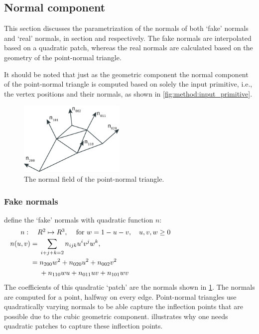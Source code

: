 
\subsection{Normal component}\label{ss:normal_component}
This section discusses the parametrization of the normals of both `fake' normals and `real' normals, in section  and  respectively. The fake normals are interpolated based on a quadratic patch, whereas the real normals are calculated based on the geometry of the point-normal triangle. 

It should be noted that just as the geometric component the normal component of the point-normal triangle is computed based on solely the input primitive, i.e., the vertex positions and their normals, as shown in \cref{fig:method:input_primitive}. 

\begin{figure}
	\centering
	\includegraphics[width=0.45\textwidth]{./content/img/method/normals.png}
	\caption{The normal field of the point-normal triangle.}
	\label{fig:method:normal_field}
\end{figure}

\subsubsection{Fake normals}
\label{sss:method:normals:fakeNormals}
	\citeauthor{vlachos2001curved} define the `fake' normals with quadratic function $n$:
	\begin{align}
	\noalign{$n: \quad R^2 \mapsto R^3,\quad$ for $w = 1 - u - v, \quad u, v, w \geq 0$}
	\begin{split}\label{eq:method:quadratic_normal_patch}
	    n(u,v) ={}& \sum_{i + j + k = 2} n_{ijk}u^i v^j w^k,\\
	      	   ={}& n_{200}w^2 + n_{020}u^2 + n_{002}v^2\\
	      	    {}& + n_{110}wu + n_{011}uv + n_{101}wv\\
	\end{split}
	\end{align}
	The coefficients of this quadratic `patch' are the normals shown in \cref{fig:method:normal_field}. The normals are computed for a point, halfway on every edge. Point-normal triangles use quadratically varying normals to be able capture the inflection points that are possible due to the cubic geometric component.  illustrates why one needs quadratic patches to capture these inflection points. 

